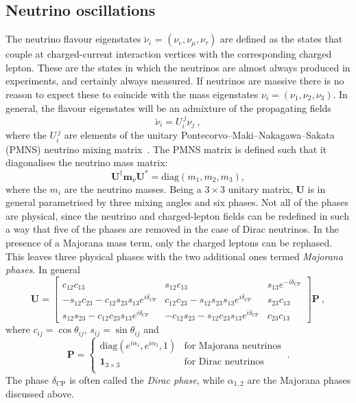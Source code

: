 \subsection{Neutrino oscillations}

The neutrino flavour eigenstates $\breve{\nu}_{i}$ =
$(\nu_{e}, \nu_{\mu}, \nu_{\tau})$ are defined as the states that couple at
charged-current interaction vertices with the corresponding charged lepton.
These are the states in which the neutrinos are almost always produced in
experiments, and certainly always measured. If neutrinos are massive there is no
reason to expect these to coincide with the mass eigenstates
$\nu_{i} = (\nu_{1}, \nu_{2}, \nu_{3})$. In general, the flavour eigenstates
will be an admixture of the propagating fields
\begin{equation}
  \label{eq:neutrino-mixing}
  \breve{\nu}_{i} = U_{i}^{\ j} \nu_{j} \ ,
\end{equation}
where the $U_{i}^{\ j}$ are elements of the unitary
Pontecorvo--Maki--Nakagawa--Sakata (PMNS) neutrino mixing
matrix~\cite{Pontecorvo:1957cp, Maki:1962mu}. The PMNS matrix is defined such
that it diagonalises the neutrino mass matrix:
\begin{equation}
  \mathbf{U}^{\dagger} \mathbf{m}_{\nu} \mathbf{U}^{*} = \mathrm{diag}(m_{1}, m_{2}, m_{3}),
\end{equation}
where the $m_i$ are the neutrino masses. Being a $3 \times 3$ unitary matrix,
$\mathbf{U}$ is in general parametrised by three mixing angles and six phases.
Not all of the phases are physical, since the neutrino and charged-lepton fields
can be redefined in such a way that five of the phases are removed in the case
of Dirac neutrinos. In the presence of a Majorana mass term, only the charged
leptons can be rephased. This leaves three physical phases with the two
additional ones termed \textit{Majorana phases}. In general
\begin{equation}
  \label{eq:pmns}
  \mathbf{U} =
  \begin{bmatrix}
    c_{12}c_{13} & s_{12} c_{13} & s_{13}e^{-i\delta_\text{CP}} \\
    -s_{12}c_{23} - c_{12}s_{23}s_{13}e^{i\delta_\text{CP}} & c_{12}c_{23} - s_{12}s_{23}s_{13}e^{i\delta_\text{CP}} & s_{23}c_{13}\\
    s_{12}s_{23} - c_{12}c_{23}s_{13}e^{i\delta_\text{CP}} & -c_{12}s_{23} - s_{12}c_{23}s_{13}e^{i\delta_\text{CP}} & c_{23}c_{13}
  \end{bmatrix}
  \mathbf{P} \ ,
\end{equation}
where $c_{ij} = \cos \theta_{ij}$, $s_{ij} = \sin \theta_{ij}$ and
\begin{equation}
  \mathbf{P} =
  \begin{cases}
    \mathrm{diag}(e^{i \alpha_{1}}, e^{i \alpha_{2}}, 1) & \text{for Majorana neutrinos} \\
    \mathbf{1}_{3 \times 3} & \text{for Dirac neutrinos} \\
  \end{cases} \ .
\end{equation}
The phase $\delta_{\text{CP}}$ is often called the \textit{Dirac phase}, while
$\alpha_{1,2}$ are the Majorana phases discussed above.

